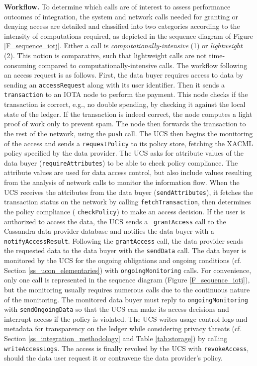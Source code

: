 \textbf{Workflow.}
To determine which calls are of interest to assess performance outcomes of integration, the system and network calls needed for granting or denying access are detailed and classified into two categories according to the intensity of computations required,
as depicted in the sequence diagram of Figure \ref{F_sequence_iotj}. Either a call is  \emph{computationally-intensive} (1) or \emph{lightweight} (2).
This notion is comparative, such that lightweight calls are not time-consuming compared to computationally-intensive calls. 
The workflow following an access request is as follows. First, the data buyer requires access to data by sending an \texttt{accessRequest} along with its user identifier. 
Then it sends a \texttt{transaction} to an IOTA node to perform the payment. 
This node checks if the transaction is correct, e.g., no double spending, by checking it against the local state of the ledger.
If the transaction is indeed correct, the node computes a light proof of work only to prevent spam. The node then forwards the transaction to the rest of the network, using the \texttt{push} call.
The UCS then begins the monitoring of the access and sends a \texttt{requestPolicy} to its policy store, fetching the XACML policy specified by the data provider.
The UCS asks for attribute values of the data buyer (\texttt{requireAttributes}) to be able to check policy compliance. The attribute values are used for data access control, but also include values resulting from the analysis of network calls to monitor the information flow.  
When the UCS receives the attributes from the data buyer (\texttt{sendAttributes}), it fetches the transaction status on the network by calling \texttt{fetchTransaction}, then determines the policy compliance ( \texttt{checkPolicy}) to make an access decision. If the user is authorized to access the data, the UCS sends a \texttt{ grantAccess} call to the Cassandra data provider database and notifies the data buyer with a \texttt{notifyAccessResult}. Following the \texttt{grantAccess} call, the data provider sends the requested data to the data buyer with the \texttt{sendData} call.
The data buyer is monitored by the UCS for the ongoing obligations and ongoing conditions (cf. Section \ref{ss_ucon_elementaries}) with \texttt{ongoingMonitoring} calls. For convenience, only one call is represented in the sequence diagram (Figure \ref{F_sequence_iotj}),
but the monitoring usually requires numerous calls due to the continuous nature of the monitoring. The monitored data buyer must reply to \texttt{ongoingMonitoring} with \texttt{sendOngoingData} so that the UCS can make its access decisions and interrupt access if the policy is violated.
The UCS writes usage control logs and metadata for transparency on the ledger while considering privacy threats (cf. Section \ref{ss_integration_methodology} and Table \ref{tab:storage}) by calling \texttt{writeAccessLogs}. The access is finally revoked by the UCS with \texttt{revokeAccess}, should the data user request it or contravene the data provider's policy.

